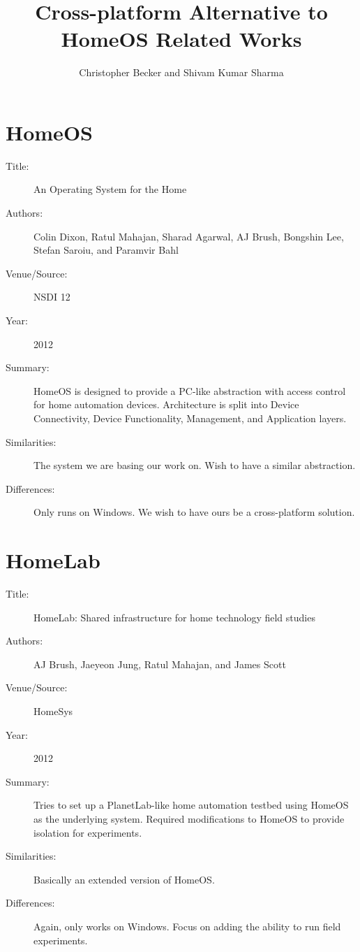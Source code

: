 \documentclass[letterpaper,12pt]{article}
\title{Cross-platform Alternative to HomeOS Related Works}
\author{Christopher Becker and Shivam Kumar Sharma}
\begin{document}
\maketitle

\section{HomeOS~\cite{homeOS}}
\begin{description}
 \item[Title:] An Operating System for the Home
 \item[Authors:] Colin Dixon, Ratul Mahajan, Sharad Agarwal, AJ Brush, Bongshin Lee, Stefan Saroiu, and Paramvir Bahl
 \item[Venue/Source:] NSDI 12
 \item[Year:] 2012
 \item[Summary:] HomeOS is designed to provide a PC-like abstraction with access control for home automation devices.  Architecture is split into Device Connectivity, Device Functionality, Management, and Application layers.
 \item[Similarities:] The system we are basing our work on.  Wish to have a similar abstraction.
 \item[Differences:] Only runs on Windows. We wish to have ours be a cross-platform solution.
\end{description}

\section{HomeLab~\cite{homeLab}}
\begin{description}
 \item[Title:] HomeLab: Shared infrastructure for home technology field studies
 \item[Authors:] AJ Brush, Jaeyeon Jung, Ratul Mahajan, and James Scott
 \item[Venue/Source:] HomeSys
 \item[Year:] 2012
 \item[Summary:] Tries to set up a PlanetLab-like home automation testbed using HomeOS as the underlying system. Required modifications to HomeOS to provide isolation for experiments.
 \item[Similarities:] Basically an extended version of HomeOS.
 \item[Differences:] Again, only works on Windows.  Focus on adding the ability to run field experiments.
\end{description}
\end{document}
